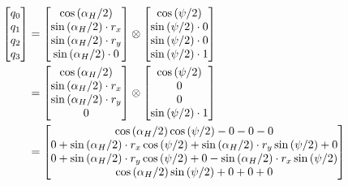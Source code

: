 \documentclass{article}
\numberwithin{equation}{section} %
\begin{document}
\begin{align}
	\begin{bmatrix}
		q_0 \\
		q_1 \\
		q_2 \\
		q_3 \\
	\end{bmatrix}
	&=
	\begin{bmatrix}
		\cos \left( \alpha_H / 2 \right) \\
		\sin \left( \alpha_H / 2 \right) \cdot r_x \\
		\sin \left( \alpha_H / 2 \right) \cdot r_y \\
		\sin \left( \alpha_H / 2 \right) \cdot 0 \\
	\end{bmatrix}
	\otimes
	\begin{bmatrix}
		\cos \left( \psi / 2 \right) \\
		\sin \left( \psi / 2 \right) \cdot 0 \\
		\sin \left( \psi / 2 \right) \cdot 0 \\
		\sin \left( \psi / 2 \right) \cdot 1 \\
	\end{bmatrix} \notag \\
	&=
	\begin{bmatrix}
		\cos \left( \alpha_H / 2 \right) \\
		\sin \left( \alpha_H / 2 \right) \cdot r_x \\
		\sin \left( \alpha_H / 2 \right) \cdot r_y \\
		0 \\%
	\end{bmatrix}
	\otimes
	\begin{bmatrix}
		\cos \left( \psi / 2 \right) \\
		0 \\ %
		0 \\ %
		\sin \left( \psi / 2 \right) \cdot 1 \\
	\end{bmatrix} \notag \\
	&=
	\begin{bmatrix}
		\cos \left( \alpha_H / 2 \right) \cos \left( \psi / 2 \right) - 0 - 0 - 0 \\
		0 + \sin \left( \alpha_H / 2 \right) \cdot r_x \cos \left( \psi / 2 \right)  + \sin \left( \alpha_H / 2 \right) \cdot r_y \sin \left( \psi / 2 \right) + 0 \\
		0 + \sin \left( \alpha_H / 2 \right) \cdot r_y \cos \left( \psi / 2 \right) + 0 - \sin \left( \alpha_H / 2 \right) \cdot r_x \sin \left( \psi / 2 \right) \\
		\cos \left( \alpha_H / 2 \right) \sin \left( \psi / 2 \right)  + 0 + 0 + 0 \\
	\end{bmatrix}
\end{align}
\end{document}
